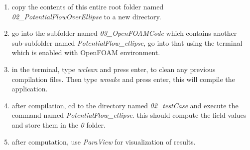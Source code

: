\documentclass[12pt]{article}
\begin{document}
\begin{enumerate}
	\item copy the contents of this entire root folder named \emph{02\_PotentialFlowOverEllipse} to a new directory.
	\item go into the subfolder named \emph{03\_OpenFOAMCode} which contains another sub-subfolder named \emph{PotentialFlow\_ellipse}, go into that using the terminal which is enabled with OpenFOAM environment.
	\item in the terminal, type \emph{wclean} and press enter, to clean any previous compilation files. Then type \emph{wmake} and press enter, this will compile the application.
	\item after compilation, cd to the directory named \emph{02\_testCase} and execute the command named \emph{PotentialFlow\_ellipse}. this should compute the field values and store them in the \emph{0} folder.
	\item after computation, use \emph{ParaView} for visualization of results.
\end{enumerate}
\end{document}
